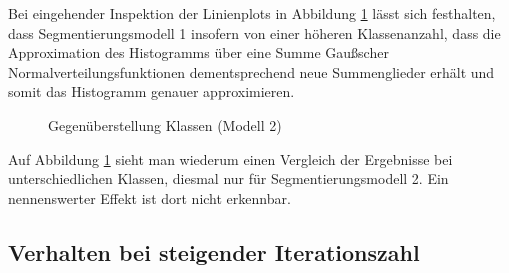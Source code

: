 			Bei eingehender Inspektion der Linienplots in Abbildung \ref{fig:classes-compare2} lässt sich festhalten, dass Segmentierungsmodell 1 insofern von einer höheren Klassenanzahl, dass die Approximation des Histogramms über eine Summe Gaußscher Normalverteilungsfunktionen dementsprechend neue Summenglieder erhält und somit das Histogramm genauer approximieren.
			\begin{figure}[H]
				\centering
				
				\caption{Gegenüberstellung Klassen (Modell 2) }
				\label{fig:classes-compare2}
			\end{figure}
			Auf Abbildung \ref{fig:classes-compare2} sieht man wiederum einen Vergleich der Ergebnisse bei unterschiedlichen Klassen, diesmal nur für Segmentierungsmodell 2. Ein nennenswerter Effekt ist dort nicht erkennbar.
			
		\subsection{Verhalten bei steigender Iterationszahl}
		\label{sub:behav-rising-it}
			